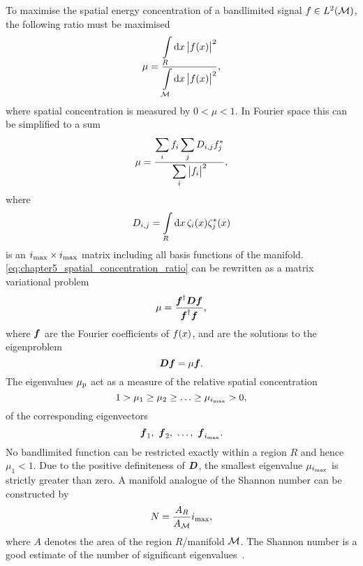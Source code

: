 To maximise the spatial energy concentration of a bandlimited signal \(f \in L^{2}(\mathcal{M})\), the following ratio must be maximised
%
\begin{equation}
	\mu
	= \frac{\displaystyle\int\limits_{R} \dd{x} \big\lvert f(x)\big\rvert^{2}}{\displaystyle\int\limits_{\mathcal{M}} \dd{x} \big\lvert f(x)\big\rvert^{2}},
\end{equation}
%
where spatial concentration is measured by \(0 < \mu < 1\).
In Fourier space this can be simplified to a sum
%
\begin{equation}\label{eq:chapter5_spatial_concentration_ratio}
	\mu
	= \frac{\displaystyle\sum\limits_{i} f_{i} \displaystyle\sum\limits_{j} D_{i,j} f_{j}^{\ast}}{\displaystyle\sum\limits_{i} \big\lvert f_{i}\big\rvert^{2}},
\end{equation}
%
where
%
\begin{equation}
	D_{i,j}
	= \displaystyle\int\limits_{R} \dd{x} \zeta_{i}(x) \zeta_{j}^{\ast}(x)
\end{equation}
%
is an \(i_{\text{max}} \times i_{\text{max}}{}\) matrix including all basis functions of the manifold.
\cref{eq:chapter5_spatial_concentration_ratio} can be rewritten as a matrix variational problem
%
\begin{equation}
	\mu
	= \frac{\vb*{f}^{\dagger} \vb*{D} \vb*{f}}{\vb*{f}^{\dagger} \vb*{f}},
\end{equation}
%
where \(\vb*{f}\) are the Fourier coefficients of \(f(x)\), and are the solutions to the eigenproblem
%
\begin{equation}\label{eq:chapter5_eigenproblem}
	\vb*{D}\vb*{f}
	= \mu \vb*{f}.
\end{equation}
%
The eigenvalues \({\mu}_{p}\) act as a measure of the relative spatial concentration
%
\begin{equation}
	1 > \mu_{1} \geq \mu_{2} \geq \ldots \geq \mu_{\imax} > 0, %
\end{equation}
%
of the corresponding eigenvectors
%
\begin{equation}
	\vb*{f}_{1},\ \vb*{f}_{2},\ \ldots,\ \vb*{f}_{i_{\text{max}}}.
\end{equation}
%
No bandlimited function can be restricted exactly within a region \(R\) and hence \(\mu_{1}<1\).
Due to the positive definiteness of \(\vb*{D}\), the smallest eigenvalue \(\mu_{i_{\text{max}}}\) is strictly greater than zero.
A manifold analogue of the Shannon number can be constructed by
%
\begin{equation}\label{eq:chapter5_shannon}
	N
	= \frac{A_{R}}{A_{\mathcal{M}}} i_{\text{max}},
\end{equation}
%
where \(A\) denotes the area of the region \(R\)/manifold \(\mathcal{M}{}\).
The Shannon number is a good estimate of the number of significant eigenvalues~\cite{Percival1993}.

